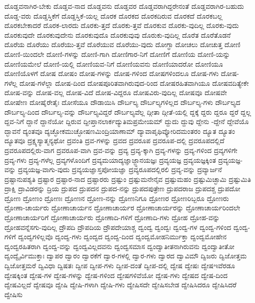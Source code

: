 {ದೊಡ್ಡವನಾಗಿರ-ಬೇಕು
ದೊಡ್ಡವ-ನಾದ
ದೊಡ್ಡವನು
ದೊಡ್ಡವರ
ದೊಡ್ಡವರಾಗಿದ್ದರೇನಂತೆ
ದೊಡ್ಡವರಾಗಿರ-ಬಹುದು
ದೊಡ್ಡ-ವರು
ದೊಡ್ಡಸ್ತಿಕೆಗೆ
ದೊಡ್ಡಸ್ತಿಕೆ-ಯಲ್ಲ
ದೊರಕ
ದೊರಕದ
ದೊರಕದಿರುವ
ದೊರಕದೆ
ದೊರಕಬಲ್ಲ
ದೊರಕಬೇಕಾದರೆ
ದೊರಕ-ಲಾರದು
ದೊರಕು-ತ್ತದೆ
ದೊರಕು-ತ್ತವೆ
ದೊರಕುವ
ದೊರಕು-ವುದಿಲ್ಲ
ದೊರಕು-ವುದು
ದೊರಕುವುದೇ
ದೊರಕುವುದೇನು
ದೊರಕುವುದೊ
ದೊರಕುವುವು
ದೊರುಕು-ವುದಿಲ್ಲ
ದೊರೆತ
ದೊರೆತೊಡನೆ
ದೊರೆಯ
ದೊರೆಯು
ದೊರೆಯು-ತ್ತವೆ
ದೊರೆಯುವ
ದೊರೆಯು-ವುದು
ದೋಗ್ಧಾ
ದೋಚಲು
ದೋಚುತ್ತ
ದೋಣಿ
ದೋಣಿ-ಯಿಂದಲೇ
ದೋಣಿ-ಗಳನ್ನು
ದೋಣಿ-ಗಾಗಿ
ದೋಣಿಗಾರ-ನಿಗೆ
ದೋಣಿಗೆ
ದೋಣಿಯ
ದೋಣಿ-ಯನ್ನು
ದೋಣಿಯಮೇಲೆ
ದೋಣಿ-ಯಲ್ಲಿ
ದೋಣಿಯವ-ನಿಗೆ
ದೋಣಿಯವನು
ದೋಣಿಯಾದರೋ
ದೋಣಿಯೂ
ದೋಣಿಯೊಳಗೆ
ದೋಷ
ದೋಷಂ
ದೋಷ-ಗಳನ್ನು
ದೋಷ-ಗಳಿಂದ
ದೋಷಗಳಿಂದಲೂ
ದೋಷ-ಗಳು
ದೋಷ-ಗಳೆಲ್ಲ
ದೋಷ-ಗಳೆಲ್ಲಾ
ದೋಷ-ದಿಂದ
ದೋಷಪೂರಿತವಾಗಿರುವುದ-ರಿಂದ
ದೋಷರಹಿತವಾಗಿಯೂ
ದೋಷವದಿತ್ಯೇಕೇ
ದೋಷ-ವನ್ನು
ದೋಷ-ವಲ್ಲ
ದೋಷ-ವಿದೆ
ದೋಷ-ವಿದ್ದರೂ
ದೋಷವಿರು-ವುದಿಲ್ಲ
ದೋಷವೂ
ದೋಷವೇ
ದೋಷೇಣ
ದೋಷೈರೇತೈಃ
ದೋಸೆಯೂ
ದೌಡಾಯಿಸಿ
ದೌರ್ಬಲ್ಯ
ದೌರ್ಬಲ್ಯಗಳಿಲ್ಲದ
ದೌರ್ಬಲ್ಯ-ಗಳು
ದೌರ್ಬಲ್ಯದ
ದೌರ್ಬಲ್ಯ-ದಿಂದ
ದೌರ್ಬಲ್ಯ-ವನ್ನು
ದೌರ್ಬಲ್ಯವಿದ್ದರೆ
ದೌರ್ಬಲ್ಯವೆಲ್ಲ
ದ್ಗೀತಾ
ದ್ಗೀತೆ-ಯಲ್ಲಿ
ದ್ದಕ್ಕೆ
ದ್ದರು
ದ್ದರೂ
ದ್ದರೆ
ದ್ದಲ್ಲ
ದ್ದವ-ನಿಗೆ
ದ್ದಾನೆ
ದ್ದಾನೆಯೋ
ದ್ದಿರುವ
ದ್ದೀಪ್ತಾನಲಾರ್ಕದ್ಯುತಿಮಪ್ರಮೇಯಮ್
ದ್ದುದು
ದ್ದುವು
ದ್ದೇನು
-ದ್ದೇನೆ
ದ್ದೇವೆಯೊ
ದ್ಭಾವನೆ
ದ್ಯಂತವೂ
ದ್ಯಚ್ಛೋಕಮುಚ್ಛೋಷಣಮಿಂದ್ರಿಯಾಣಾಮ್
ದ್ಯಾವಾಪೃಥಿವ್ಯೋರಿದಮಂತರಂ
ದ್ಯೂತ
ದ್ಯೂತಂ
ದ್ಯೂತವೂ
ದ್ರಕ್ಷ್ಯಸ್ಯಾತ್ಮನ್ಯಥೋ
ದ್ರವಂತಿ
ದ್ರವ-ಗಳನ್ನು
ದ್ರವದ
ದ್ರವರೂಪ
ದ್ರವರೂಪ-ದಲ್ಲಿ
ದ್ರವರೂಪದಲ್ಲಿದೆ
ದ್ರವರೂಪದಲ್ಲಿರು-ವಾಗ
ದ್ರವರೂಪ-ವಾಗಿ
ದ್ರವ-ವನ್ನು
ದ್ರವ್ಯ
ದ್ರವ್ಯ-ಕ್ಕಾಗಿ
ದ್ರವ್ಯ-ಗಳನ್ನು
ದ್ರವ್ಯ-ಗಳಿಂದ
ದ್ರವ್ಯಗಳಿಗೇ
ದ್ರವ್ಯ-ಗಳು
ದ್ರವ್ಯ-ಗಳೆಲ್ಲ
ದ್ರವ್ಯಗಳೊಂದಿಗೆ
ದ್ರವ್ಯಮಯಾದ್ಯಜ್ಞಾಜ್ಜ್ಞಾನಯಜ್ಞಃ
ದ್ರವ್ಯಯಜ್ಞ
ದ್ರವ್ಯಯಜ್ಞಕ್ಕಿಂತ
ದ್ರವ್ಯಯಜ್ಞ-ವನ್ನು
ದ್ರವ್ಯಯಜ್ಞ-ವಾಗು-ವುದು
ದ್ರವ್ಯಯಜ್ಞಾಸ್ತಪೋಯಜ್ಞಾ
ದ್ರವ್ಯರೂಪದಲ್ಲಿರಲಿ
ದ್ರವ್ಯ-ವನ್ನು
ದ್ರವ್ಯಾರ್ಜನೆ
ದ್ರಷ್ಟಾನುಪಶ್ಯತಿ
ದ್ರಷ್ಟಾರ
ದ್ರಷ್ಟಾರ-ನಾದ
ದ್ರಷ್ಟಾರರು
ದ್ರಷ್ಟುಂ
ದ್ರಷ್ಟುಮನೇನೈವ
ದ್ರಷ್ಟುಮಹಂ
ದ್ರಷ್ಟುಮಿಚ್ಛಾಮಿ
ದ್ರಷ್ಟುಮಿತಿ
ದ್ರಾಕ್ಷಿ
ದ್ರಾವಿಡರನ್ನು
ದ್ರಿಯ
ದ್ರುಪದ
ದ್ರುಪದನ
ದ್ರುಪದ-ನನ್ನು
ದ್ರುಪದಪುತ್ರೇಣ
ದ್ರುಪದರಾಜ
ದ್ರುಪದಶ್ಚ
ದ್ರುಪದೋ
ದ್ರೋಣ
ದ್ರೋಣಂ
ದ್ರೋಣಃ
ದ್ರೋಣನ
ದ್ರೋಣ-ನನ್ನು
ದ್ರೋಣನಿಗೂ
ದ್ರೋಣರ
ದ್ರೋಣರಿಬ್ಬರೂ
ದ್ರೋಣರು
ದ್ರೋಣಾ-ಚಾರ್ಯರು
ದ್ರೋಣಾಚಾರ್ಯನ
ದ್ರೋಣಾಚಾರ್ಯರ
ದ್ರೋಣಾಚಾರ್ಯರನ್ನು
ದ್ರೋಣಾಚಾರ್ಯರಿಂದಲೇ
ದ್ರೋಣಾಚಾರ್ಯರಿಗೆ
ದ್ರೋಣಾಚಾರ್ಯರು
ದ್ರೋಣಾದಿ-ಗಳಿಗೆ
ದ್ರೋಣಾದಿ-ಗಳು
ದ್ರೋಹ
ದ್ರೋಹ-ವನ್ನು
ದ್ರೋಹವನ್ನೆಸಗು-ವುದಿಲ್ಲ
ದ್ರೌಪದಿ
ದ್ರೌಪದಿಯ
ದ್ರೌಪದೇಯಾಶ್ಚ
ದ್ವಂದ್ವ
ದ್ವಂದ್ವಃ
ದ್ವಂದ್ವ-ಗಳ
ದ್ವಂದ್ವ-ಗಳಿಂದ
ದ್ವಂದ್ವ-ಗಳಿಗೆ
ದ್ವಂದ್ವಗಳಿಲ್ಲವೊ
ದ್ವಂದ್ವ-ಗಳು
ದ್ವಂದ್ವದ
ದ್ವಂದ್ವ-ದಿಂದ
ದ್ವಂದ್ವಮೋಹನಿರ್ಮುಕ್ತಾ
ದ್ವಂದ್ವಮೋಹೇನ
ದ್ವಂದ್ವರಹಿತರಾಗಿ
ದ್ವಂದ್ವ-ವನ್ನು
ದ್ವಂದ್ವವಿಲ್ಲದವನು
ದ್ವಂದ್ವಸಮಾಸ
ದ್ವಂದ್ವಾತೀತನಾಗಿರುವನು
ದ್ವಂದ್ವಾತೀತೋ
ದ್ವಂದ್ವೈರ್ವಿಮುಕ್ತಾಃ
ದ್ವಾಪರ
ದ್ವಾರಂ
ದ್ವಾರಕೆಗೆ
ದ್ವಾರ-ಗಳಲ್ಲಿ
ದ್ವಾರ-ಗಳು
ದ್ವಾರದ
ದ್ವಾವಿಮೌ
ದ್ವಿಜರು
ದ್ವಿಜೋತ್ತಮ
ದ್ವಿಜೋತ್ತಮರೆ
ದ್ವಿವಿಧಾ
ದ್ವಿಷತಃ
ದ್ವೀಪ
ದ್ವೀಪ-ಗಳು
ದ್ವೀಪ-ದಂತೆ
ದ್ವೀಪ-ದಲ್ಲಿ
ದ್ವೇಷ
ದ್ವೇಷಃ
ದ್ವೇಷಇವೆರಡೂ
ದ್ವೇಷಕ್ಕಿಂತ
ದ್ವೇಷ-ಗಳ
ದ್ವೇಷ-ಗಳನ್ನು
ದ್ವೇಷ-ಗಳಿಂದ
ದ್ವೇಷಗಳಿವೆಯೋ
ದ್ವೇಷ-ಗಳು
ದ್ವೇಷದ
ದ್ವೇಷ-ದಿಂದ
ದ್ವೇಷವಿಲ್ಲದೆ
ದ್ವೇಷವೂ
ದ್ವೇಷಿ
ದ್ವೇಷಿ-ಗಳಾಗಿ
ದ್ವೇಷಿ-ಗಳು
ದ್ವೇಷಿಸದೇ
ದ್ವೇಷಿಸಬೇಡ
ದ್ವೇಷಿಸಿದರೂ
ದ್ವೇಷಿಸಿದರೆ
ದ್ವೇಷಿಸು
}
